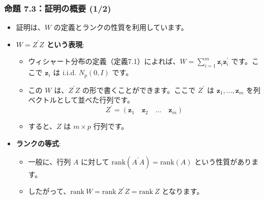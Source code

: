 \documentclass[aspectratio=169]{beamer}
\begin{document}
\begin{frame}
\frametitle{命題 7.3：証明の概要 (1/2)}
\begin{itemize}
    \item 証明は、$W$ の定義とランクの性質を利用しています。
    \item \textbf{$W=Z^{\prime}Z$ という表現}:
    \begin{itemize}
        \item ウィシャート分布の定義（定義7.1）によれば、$W=\sum_{i=1}^{m}\bm{z}_{i}\bm{z}_{i}^{\prime}$ です。ここで $\bm{z}_i$ は i.i.d. $N_p(0,I)$ です。
        \item この $W$ は、$Z^{\prime}Z$ の形で書くことができます。ここで $Z^{\prime}$ は $\bm{z}_1,...,\bm{z}_m$ を列ベクトルとして並べた行列です。
        \[ Z^{\prime}=(\bm{z}_1\quad\bm{z}_2\quad\dots\quad\bm{z}_m) \]
        \item すると、$Z$ は $m \times p$ 行列です。
    \end{itemize}
    \item \textbf{ランクの等式}:
    \begin{itemize}
        \item 一般に、行列 $A$ に対して $\text{rank}(A^{\prime}A)=\text{rank}(A)$ という性質があります。
        \item したがって、$\text{rank}~W=\text{rank}~Z^{\prime}Z=\text{rank}~Z$ となります。
    \end{itemize}
\end{itemize}
\end{frame}
\end{document}

